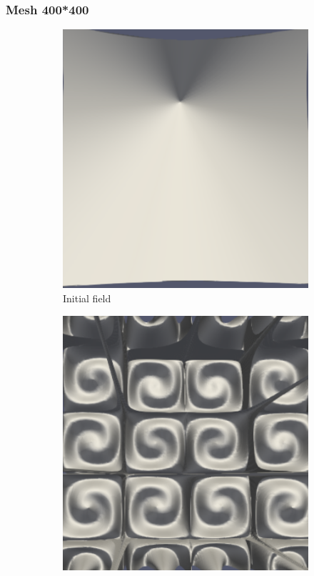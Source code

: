 \documentclass{article}
\begin{document}
\subsubsection{Mesh 400*400}
\begin{figure}[hbt!]
  \begin{subfigure}{0.4\textwidth}
        \centering
        \includegraphics[width=\textwidth]{Figures/5e-5 400x400/for n 1.png}
        \caption{Initial field}
  \end{subfigure}
  \hfill
  \begin{subfigure}{0.4\textwidth}
        \centering
        \includegraphics[width=\textwidth]{Figures/5e-5 400x400/for n 20.png}

\end{subfigure}
\end{figure}
\end{document}
